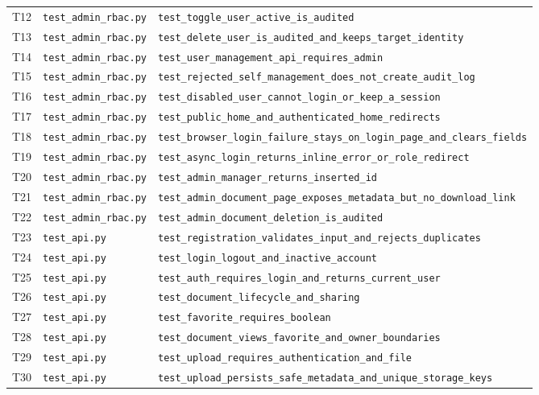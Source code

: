{\begin{longtable}{P{.8cm}P{4cm}P{8cm}}
T12 & \nolinkurl{test_admin_rbac.py} & \nolinkurl{test_toggle_user_active_is_audited} \\
T13 & \nolinkurl{test_admin_rbac.py} & \nolinkurl{test_delete_user_is_audited_and_keeps_target_identity} \\
T14 & \nolinkurl{test_admin_rbac.py} & \nolinkurl{test_user_management_api_requires_admin} \\
T15 & \nolinkurl{test_admin_rbac.py} & \nolinkurl{test_rejected_self_management_does_not_create_audit_log} \\
T16 & \nolinkurl{test_admin_rbac.py} & \nolinkurl{test_disabled_user_cannot_login_or_keep_a_session} \\
T17 & \nolinkurl{test_admin_rbac.py} & \nolinkurl{test_public_home_and_authenticated_home_redirects} \\
T18 & \nolinkurl{test_admin_rbac.py} & \nolinkurl{test_browser_login_failure_stays_on_login_page_and_clears_fields} \\
T19 & \nolinkurl{test_admin_rbac.py} & \nolinkurl{test_async_login_returns_inline_error_or_role_redirect} \\
T20 & \nolinkurl{test_admin_rbac.py} & \nolinkurl{test_admin_manager_returns_inserted_id} \\
T21 & \nolinkurl{test_admin_rbac.py} & \nolinkurl{test_admin_document_page_exposes_metadata_but_no_download_link} \\
T22 & \nolinkurl{test_admin_rbac.py} & \nolinkurl{test_admin_document_deletion_is_audited} \\
T23 & \nolinkurl{test_api.py} & \nolinkurl{test_registration_validates_input_and_rejects_duplicates} \\
T24 & \nolinkurl{test_api.py} & \nolinkurl{test_login_logout_and_inactive_account} \\
T25 & \nolinkurl{test_api.py} & \nolinkurl{test_auth_requires_login_and_returns_current_user} \\
T26 & \nolinkurl{test_api.py} & \nolinkurl{test_document_lifecycle_and_sharing} \\
T27 & \nolinkurl{test_api.py} & \nolinkurl{test_favorite_requires_boolean} \\
T28 & \nolinkurl{test_api.py} & \nolinkurl{test_document_views_favorite_and_owner_boundaries} \\
T29 & \nolinkurl{test_api.py} & \nolinkurl{test_upload_requires_authentication_and_file} \\
T30 & \nolinkurl{test_api.py} & \nolinkurl{test_upload_persists_safe_metadata_and_unique_storage_keys} \\

\end{longtable}}
